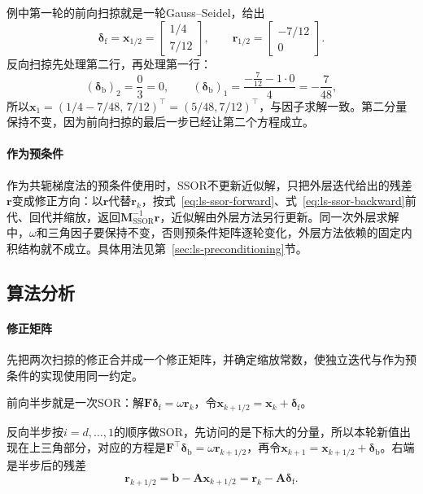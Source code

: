例中第一轮的前向扫掠就是一轮Gauss--Seidel，给出
\[
 \bm\delta_{\mathrm f}=\bm x_{1/2}=\begin{bmatrix}1/4\\7/12\end{bmatrix},\qquad
 \bm r_{1/2}=\begin{bmatrix}-7/12\\0\end{bmatrix}.
\]
反向扫掠先处理第二行，再处理第一行：
\[
 (\bm\delta_{\mathrm b})_2=\frac{0}{3}=0,\qquad
 (\bm\delta_{\mathrm b})_1=\frac{-\tfrac7{12}-1\cdot0}{4}=-\frac7{48},
\]
所以$\bm x_1=(1/4-7/48,\,7/12)^\top=(5/48,7/12)^\top$，与因子求解一致。第二分量保持不变，因为前向扫掠的最后一步已经让第二个方程成立。

\paragraph{作为预条件}
作为共轭梯度法的预条件使用时，SSOR不更新近似解，只把外层迭代给出的残差$\bm r$变成修正方向：以$\bm r$代替$\bm r_k$，按式~\eqref{eq:ls-ssor-forward}、式~\eqref{eq:ls-ssor-backward}前代、回代并缩放，返回$\bm M_{\mathrm{SSOR}}^{-1}\bm r$，近似解由外层方法另行更新。同一次外层求解中，$\omega$和三角因子要保持不变，否则预条件矩阵逐轮变化，外层方法依赖的固定内积结构就不成立。具体用法见第~\ref{sec:ls-preconditioning}节。

\subsection{算法分析}

\paragraph{修正矩阵}
先把两次扫掠的修正合并成一个修正矩阵，并确定缩放常数，使独立迭代与作为预条件的实现使用同一约定。

前向半步就是一次SOR：解$\bm F\bm\delta_{\mathrm f}=\omega\bm r_k$，令$\bm x_{k+1/2}=\bm x_k+\bm\delta_{\mathrm f}$。

反向半步按$i=d,\ldots,1$的顺序做SOR，先访问的是下标大的分量，所以本轮新值出现在上三角部分，对应的方程是$\bm F^\top\bm\delta_{\mathrm b}=\omega\bm r_{k+1/2}$，再令$\bm x_{k+1}=\bm x_{k+1/2}+\bm\delta_{\mathrm b}$。右端是半步后的残差
\[
\bm r_{k+1/2}=\bm b-\bm A\bm x_{k+1/2}=\bm r_k-\bm A\bm\delta_{\mathrm f}.
\]

